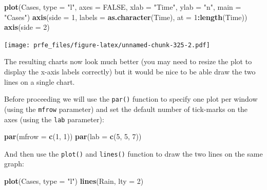 \documentclass[12pt,]{book}
\newenvironment{Shaded}{\begin{snugshade}}{\end{snugshade}}
\newcommand{\KeywordTok}[1]{\textcolor[rgb]{0.13,0.29,0.53}{\textbf{#1}}}
\newcommand{\DataTypeTok}[1]{\textcolor[rgb]{0.13,0.29,0.53}{#1}}
\newcommand{\DecValTok}[1]{\textcolor[rgb]{0.00,0.00,0.81}{#1}}
\newcommand{\StringTok}[1]{\textcolor[rgb]{0.31,0.60,0.02}{#1}}
\newcommand{\OtherTok}[1]{\textcolor[rgb]{0.56,0.35,0.01}{#1}}
\newcommand{\OperatorTok}[1]{\textcolor[rgb]{0.81,0.36,0.00}{\textbf{#1}}}
\newcommand{\NormalTok}[1]{#1}
\theoremstyle{definition}
\theoremstyle{definition}
\theoremstyle{definition}
\theoremstyle{remark}
\begin{document}
\begin{Shaded}
\begin{Highlighting}[]
\KeywordTok{plot}\NormalTok{(Cases, }\DataTypeTok{type =} \StringTok{"l"}\NormalTok{, }\DataTypeTok{axes =} \OtherTok{FALSE}\NormalTok{, }\DataTypeTok{xlab =} \StringTok{"Time"}\NormalTok{, }\DataTypeTok{ylab =} \StringTok{"n"}\NormalTok{, }\DataTypeTok{main =} \StringTok{"Cases"}\NormalTok{)}
\KeywordTok{axis}\NormalTok{(}\DataTypeTok{side =} \DecValTok{1}\NormalTok{, }\DataTypeTok{labels =} \KeywordTok{as.character}\NormalTok{(Time), }\DataTypeTok{at =} \DecValTok{1}\OperatorTok{:}\KeywordTok{length}\NormalTok{(Time))}
\KeywordTok{axis}\NormalTok{(}\DataTypeTok{side =} \DecValTok{2}\NormalTok{)}
\end{Highlighting}
\end{Shaded}

\texttt{[image: prfe\_files/figure-latex/unnamed-chunk-325-2.pdf]}

The resulting charts now look much better (you may need to resize the
plot to display the x-axis labels correctly) but it would be nice to be
able draw the two lines on a single chart.

Before proceeding we will use the \texttt{par()} function to specify one
plot per window (using the \texttt{mfrow} parameter) and set the default
number of tick-marks on the axes (using the \texttt{lab} parameter):

\begin{Shaded}
\begin{Highlighting}[]
\KeywordTok{par}\NormalTok{(}\DataTypeTok{mfrow =} \KeywordTok{c}\NormalTok{(}\DecValTok{1}\NormalTok{, }\DecValTok{1}\NormalTok{))}
\KeywordTok{par}\NormalTok{(}\DataTypeTok{lab =} \KeywordTok{c}\NormalTok{(}\DecValTok{5}\NormalTok{, }\DecValTok{5}\NormalTok{, }\DecValTok{7}\NormalTok{))}
\end{Highlighting}
\end{Shaded}

And then use the \texttt{plot()} and \texttt{lines()} function to draw
the two lines on the same graph:

\begin{Shaded}
\begin{Highlighting}[]
\KeywordTok{plot}\NormalTok{(Cases, }\DataTypeTok{type =} \StringTok{"l"}\NormalTok{)}
\KeywordTok{lines}\NormalTok{(Rain, }\DataTypeTok{lty =} \DecValTok{2}\NormalTok{)}
\end{Highlighting}
\end{Shaded}
\end{document}
